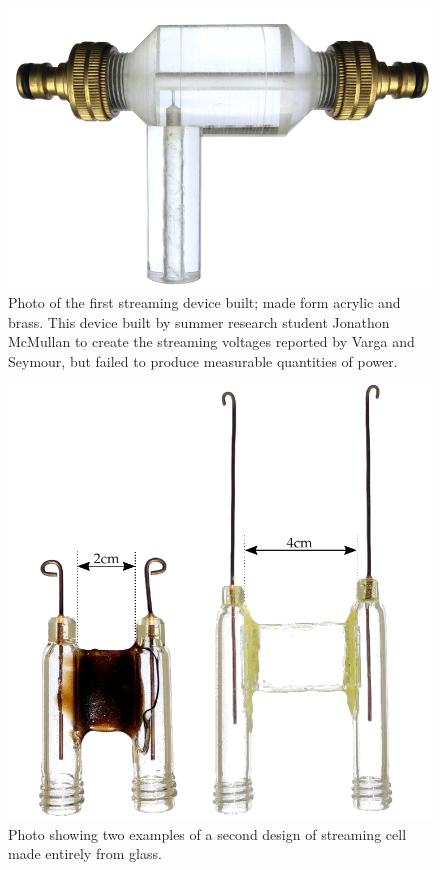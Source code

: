     \begin{figure}
      \centering
      \includegraphics[scale=0.9]{content/pt1/01-PowerHarvesting/graphics/StreamingCell_v0}
      \caption{\label{fig:first_cell}Photo of the first streaming device built; made form acrylic and brass. This device built by summer research student Jonathon McMullan to create the streaming voltages reported by Varga and Seymour, but failed to produce measurable quantities of power.}
    \end{figure}
    \begin{figure}
      \centering
      \includegraphics[scale=0.7]{content/pt1/01-PowerHarvesting/graphics/StreamingCells_v1}
      \caption{\label{fig:first_cells}Photo showing two examples of a second design of streaming cell made entirely from glass.}
    \end{figure}

